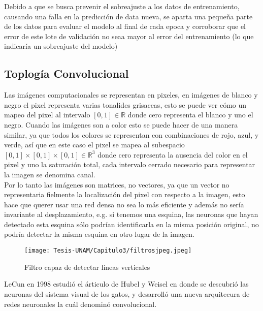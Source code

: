 Debido a que se busca prevenir el sobreajuste a los datos de entrenamiento, causando una falla en la predicción de data nueva, se aparta una pequeña parte de los datos para evaluar el modelo al final de cada epoca y corroborar que el error de este lote de validación no seaa mayor al error del entrenamiento (lo que indicaría un sobreajuste del modelo)

\subsection{Toplogía Convolucional}
Las imágenes computacionales se representan en pixeles, en imágenes de blanco y negro el pixel representa varias tonalides grisaceas, esto se puede ver cómo un mapeo del pixel al intervalo $\left[0, 1\right]\in \mathbb{R}$ donde cero representa el blanco y uno el negro. Cuando las imágenes son a color esto se puede hacer de una manera similar, ya que todos los colores se representan con combinaciones de rojo, azul, y verde, así que en este caso el pixel se mapea al subespacio $\left[0, 1\right] \times \left[0, 1\right] \times \left[0, 1\right] \in \mathbb{R}^3$ donde cero representa la ausencia del color en el pixel y uno la saturación total, cada intervalo cerrado necesario para representar la imagen se denomina canal.\\

Por lo tanto las imágenes son matrices, no vectores, ya que un vector no representaria fielmente la localización del pixel con respecto a la imagen, esto hace que querer usar una red densa no sea lo más eficiente y además no sería invariante al desplazamiento\cite{LeCun1998GradientbasedLA}, e.g. si tenemos una esquina, las neuronas que hayan detectado esta esquina sólo podrían identificarla en la misma posición original, no podría detectar la misma esquina en otro lugar de la imagen.\\

\begin{figure}[h!]
    \centering
    \texttt{[image: Tesis-UNAM/Capitulo3/filtrosjpeg.jpeg]}
    \caption{Filtro capaz de detectar líneas verticales}
    \label{fig:enter-label}
\end{figure}

LeCun en 1998 estudió el árticulo de Hubel y Weisel en donde se descubrió las neuronas del sistema visual de los gatos\cite{LeCun1998GradientbasedLA}, y desarrolló una nueva arquitecura de redes neuronales la cuál denominó convolucional.\\

